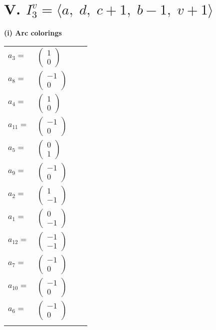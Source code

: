 \documentclass[1p]{elsarticle_modified}
\theoremstyle{definition}
\begin{document}
\centering \section*{V. $I^v_{3}= \langle a,\;d,\;c+1,\;b-1,\;v+1 \rangle$}
\flushleft \textbf{(i) Arc colorings}\\
\begin{tabular}{m{7pt} m{180pt} m{7pt} m{180pt} }
\flushright $a_{3}=$&$\begin{pmatrix}1\\0\end{pmatrix}$ \\
\flushright $a_{8}=$&$\begin{pmatrix}-1\\0\end{pmatrix}$ \\
\flushright $a_{4}=$&$\begin{pmatrix}1\\0\end{pmatrix}$ \\
\flushright $a_{11}=$&$\begin{pmatrix}-1\\0\end{pmatrix}$ \\
\flushright $a_{5}=$&$\begin{pmatrix}0\\1\end{pmatrix}$ \\
\flushright $a_{9}=$&$\begin{pmatrix}-1\\0\end{pmatrix}$ \\
\flushright $a_{2}=$&$\begin{pmatrix}1\\-1\end{pmatrix}$ \\
\flushright $a_{1}=$&$\begin{pmatrix}0\\-1\end{pmatrix}$ \\
\flushright $a_{12}=$&$\begin{pmatrix}-1\\-1\end{pmatrix}$ \\
\flushright $a_{7}=$&$\begin{pmatrix}-1\\0\end{pmatrix}$ \\
\flushright $a_{10}=$&$\begin{pmatrix}-1\\0\end{pmatrix}$ \\
\flushright $a_{6}=$&$\begin{pmatrix}-1\\0\end{pmatrix}$\\&\end{tabular}
\end{document}
